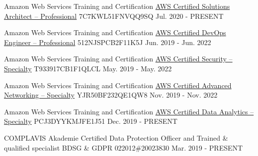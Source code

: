 

\begin{cventries}

  \cventry
    {Amazon Web Services Training and Certification}
    {\href{https://www.youracclaim.com/badges/e00de02f-620b-41b5-8ad7-3caaa7993bc9}{AWS Certified Solutions Architect – Professional}}
    {7C7KWL51FNVQQ9SQ}
    {Jul. 2020 - PRESENT}
    {}

\cventry
    {Amazon Web Services Training and Certification}
    {\href{https://www.youracclaim.com/badges/47430bb9-b9ea-4927-97af-c79b3a9c6d04}{AWS Certified DevOps Engineer – Professional}}
    {512NJSPCB2F11K5J}
    {Jun. 2019 - Jun. 2022}
    {}

\cventry
    {Amazon Web Services Training and Certification}
    {\href{https://www.youracclaim.com/badges/2cd78cd7-189d-41cd-ac59-535b65cef3f9}{AWS Certified Security – Specialty}}
    {T933917CB1F1QLCL}
    {May. 2019 - May. 2022}
    {}

\cventry
    {Amazon Web Services Training and Certification}
    {\href{https://www.youracclaim.com/badges/1eada9e9-bdeb-4bcc-b056-5519c722a312}{AWS Certified Advanced Networking – Specialty}}
    {YJR50BF232QE1QW8}
    {Nov. 2019 - Nov. 2022}
    {}

\cventry
    {Amazon Web Services Training and Certification}
    {\href{https://www.youracclaim.com/badges/ea88e1a0-800e-4d98-b116-a9614a40966c}{AWS Certified Data Analytics – Specialty}}
    {PCJ3DYYKMJFE1J51}
    {Dec. 2019 - PRESENT}
    {}

\cventry
    {COMPLAVIS Akademie}
    {Certified Data Protection Officer and Trained \& qualified specialist BDSG \& GDPR}
    {022012\#20023830}
    {Mar. 2019 - PRESENT}
    {}

\end{cventries}
